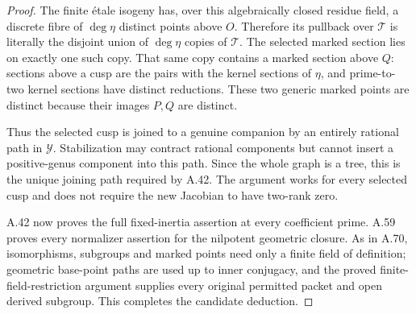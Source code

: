 \begin{proof}
The finite \'{e}tale isogeny has, over this algebraically closed
residue field, a discrete fibre of \(\deg\eta\) distinct
points above \(O\). Therefore its pullback over \(\mathcal T\)
is literally the disjoint union of \(\deg\eta\) copies of
\(\mathcal T\). The selected marked section lies on exactly
one such copy. That same copy contains a marked section above
\(Q\): sections above a cusp are the pairs with the kernel
sections of \(\eta\), and prime-to-two kernel sections have
distinct reductions. These two generic marked points are
distinct because their images \(P,Q\) are distinct.

Thus the selected cusp is joined to a genuine companion by an
entirely rational path in \(\mathcal Y\). Stabilization may
contract rational components but cannot insert a positive-genus
component into this path. Since the whole graph is a tree, this
is the unique joining path required by A.42. The argument works
for every selected cusp and does not require the new Jacobian
to have two-rank zero.

A.42 now proves the full fixed-inertia assertion at every
coefficient prime. A.59 proves every normalizer assertion for
the nilpotent geometric closure. As in A.70, isomorphisms,
subgroups and marked points need only a finite field of
definition; geometric base-point paths are used up to inner
conjugacy, and the proved finite-field-restriction argument
supplies every original permitted packet and open derived
subgroup. This completes the candidate deduction.
\end{proof}
